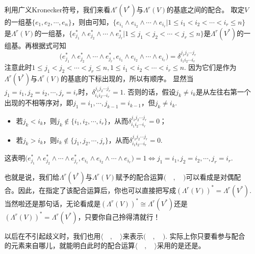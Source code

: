 利用广义Kronecker符号，我们来看$\Lambda^{r}(V^{\ast})$与$\Lambda^{r}(V)$的基底之间的配合。
取定$V$的一组基$\{e_{1} ,e_{2},\cdots,e_{n}\}$，则由可知，$\{e_{i_{1}}\wedge e_{i_{2}}\wedge \cdots\wedge e_{i_{r}} | 1\leqslant i_{1}<i_{2}<\cdots<i_{r}\leqslant n \}$是$\Lambda^{r}(V)$的一组基，$\{e^{\ast}_{j_{1}}\wedge e^{\ast}_{j_{2}}\wedge \cdots\wedge e^{\ast}_{j_{r}} | 1\leqslant j_{1}<j_{2}<\cdots<j_{r}\leqslant n \}$是$\Lambda^{r}(V^{\ast})$的一组基。再根据式可知
\[
	\bigl(e^{\ast}_{j_{1}}\wedge e^{\ast}_{j_{2}}\wedge \cdots\wedge e^{\ast}_{j_{r}} ,e_{i_{1}}\wedge e_{i_{2}}\wedge \cdots\wedge e_{i_{r}}\bigr)=\delta^{j_{1}j_{2}\cdots j_{r}}_{i_{1}i_{2}\cdots i_{r}}
\]
注意此时$1\leqslant j_{1}<j_{2}<\cdots<j_{r}\leqslant n,1\leqslant i_{1}<i_{2}<\cdots<i_{r}\leqslant n $. 因为它们是作为$\Lambda^{r}(V^{\ast})$与$\Lambda^{r}(V)$的基底的下标出现的，所以有顺序。
显然当$j_{1}=i_{1},j_{2}=i_{2},\cdots,j_{r}=i_{r}$时，$\delta^{j_{1}j_{2}\cdots j_{r}}_{i_{1}i_{2}\cdots i_{r}}=1$.
否则的话，假设$j_{k}\neq i_{k}$是从左往右第一个出现的不相等序对，即$j_{1}=i_{1},\cdots,j_{k-1}=i_{k-1}$，但$j_{k}\neq i_{k}$. 
\begin{itemize}
\item 若$j_{k}<i_{k}$，则$j_{k}\notin \{i_{1},i_{2},\cdots,i_{r} \}$，从而$\delta^{j_{1}j_{2}\cdots j_{r}}_{i_{1}i_{2}\cdots i_{r}}=0$；
\item 若$j_{k}>i_{k}$，则$i_{k}\notin \{j_{1},j_{2},\cdots,j_{r} \}$，从而$\delta^{j_{1}j_{2}\cdots j_{r}}_{i_{1}i_{2}\cdots i_{r}}=0$.
\end{itemize}
这表明$\bigl(e^{\ast}_{j_{1}}\wedge e^{\ast}_{j_{2}}\wedge \cdots\wedge e^{\ast}_{j_{r}} ,e_{i_{1}}\wedge e_{i_{2}}\wedge \cdots\wedge e_{i_{r}}\bigr)=1\Leftrightarrow j_{1}=i_{1},j_{2}=i_{2},\cdots,j_{r}=i_{r}$. 

也就是说，我们给$\Lambda^{r}(V^{\ast})$与$\Lambda^{r}(V)$赋予的配合运算$\bigl(\quad,\quad \bigr)$可以看成是对偶配合。因此，在指定了该配合运算后，你也可以直接把写成$\left( \Lambda^{r}(V) \right)^{\ast}=\Lambda^{r}(V^{\ast})$. 当然啦还是那句话，无论看成是$\left( \Lambda^{r}(V) \right)^{\ast}\cong\Lambda^{r}(V^{\ast})$还是$\left( \Lambda^{r}(V) \right)^{\ast}=\Lambda^{r}(V^{\ast})$，只要你自己拎得清就行！

\begin{remark}
	以后在不引起歧义时，我们也用$\langle\quad,\quad\rangle$来表示$\bigl(\quad,\quad \bigr)$. 实际上你只要看参与配合的元素来自哪儿，就能明白此时的配合运算$\langle\quad,\quad\rangle$采用的是还是。
\end{remark}

